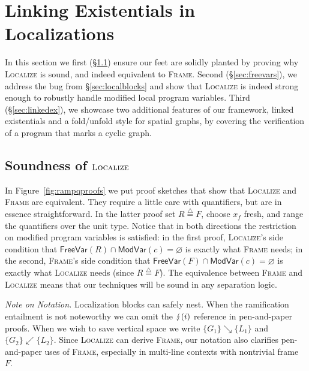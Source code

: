 \documentclass[acmsmall,screen]{acmart}
\newcommand{\MV}{\ensuremath{\mathsf{ModVar}}}
\newcommand{\FV}{\ensuremath{\mathsf{FreeVar}}}
\let\emptyset\varnothing
\newcommand{\defeq}{\mathbin{\stackrel{\triangle}{=}}}
\newcommand{\infrulestyle}[1]{\textsc{#1}}
\begin{document}
\section{Linking Existentials in Localizations}
\label{sec:localizations}
In this section we first (\S\ref{sec:rulessound}) ensure our feet are solidly planted 
by proving why \textsc{Localize} is sound, and indeed equivalent to \textsc{Frame}.  
Second (\S\ref{sec:freevars}), we address the bug from \S\ref{sec:localblocks} 
and show that \textsc{Localize} is indeed strong enough to robustly handle 
modified local program variables.  Third (\S\ref{sec:linkedex}),
we showcase two additional features of our framework, linked existentials 
and a fold/unfold style for spatial graphs, by covering the verification of 
a program that marks a cyclic graph.






\subsection{Soundness of $\infrulestyle{Localize}$}
\label{sec:rulessound}

In Figure~\ref{fig:rampqproofs} we put proof sketches that show that
\infrulestyle{Localize} and \infrulestyle{Frame} are equivalent.  They require a
little care with quantifiers, but are in essence straightforward.
In the latter proof set $R \defeq F$, choose $x_f$ fresh, and range the quantifiers
over the unit type.  Notice that in both directions the restriction on modified
program variables is satisfied: in the first proof, \textsc{Localize}'s side
condition that $\FV(R) \cap \MV(c) = \emptyset$ is exactly what \textsc{Frame} needs;
in the second, \textsc{Frame}'s side condition that $\FV(F) \cap \MV(c) = \emptyset$
is exactly what \textsc{Localize} needs (since $R \defeq F$).
The equivalence between \textsc{Frame} and \textsc{Localize} means that our techniques will be sound in any separation logic.

\emph{Note on Notation.} Localization blocks can safely nest. When the ramification entailment is not noteworthy we can omit the $\lightning(i)$ reference in pen-and-paper proofs.  When we wish to save vertical space we write $\{ G_1 \} \searrow \{ L_1 \}$ and $\{ G_2 \} \swarrow \{ L_2 \}$.
Since \infrulestyle{Localize} can derive \infrulestyle{Frame}, our notation also clarifies pen-and-paper uses of \infrulestyle{Frame}, especially in multi-line contexts with nontrivial frame~$F$.
\end{document}
